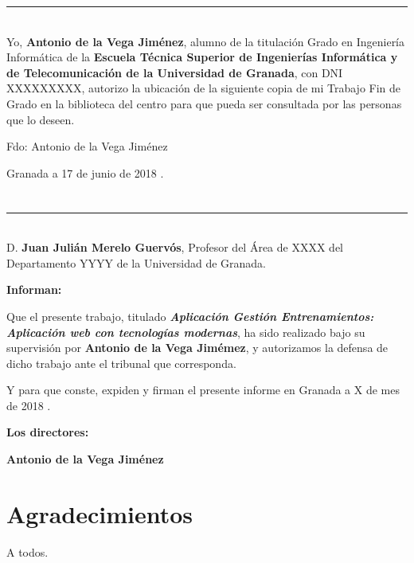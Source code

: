 \noindent\rule[-1ex]{\textwidth}{2pt}\\[4.5ex]

Yo, \textbf{Antonio de la Vega Jiménez}, alumno de la titulación Grado en Ingeniería Informática de la \textbf{Escuela Técnica Superior
de Ingenierías Informática y de Telecomunicación de la Universidad de Granada}, con DNI XXXXXXXXX, autorizo la
ubicación de la siguiente copia de mi Trabajo Fin de Grado en la biblioteca del centro para que pueda ser
consultada por las personas que lo deseen.

\vspace{6cm}

\noindent Fdo: Antonio de la Vega Jiménez

\vspace{2cm}

\begin{flushright}
Granada a 17 de junio de 2018 .
\end{flushright}


\chapter*{}
\thispagestyle{empty}

\noindent\rule[-1ex]{\textwidth}{2pt}\\[4.5ex]

D. \textbf{Juan Julián Merelo Guervós}, Profesor del Área de XXXX del Departamento YYYY de la Universidad de Granada.

\vspace{0.5cm}

\textbf{Informan:}

\vspace{0.5cm}

Que el presente trabajo, titulado \textit{\textbf{Aplicación Gestión Entrenamientos: Aplicación web con tecnologías modernas}},
ha sido realizado bajo su supervisión por \textbf{Antonio de la Vega Jimémez}, y autorizamos la defensa de dicho trabajo ante el tribunal
que corresponda.

\vspace{0.5cm}

Y para que conste, expiden y firman el presente informe en Granada a X de mes de 2018 .

\vspace{1cm}

\textbf{Los directores:}

\vspace{5cm}

\noindent \textbf{Antonio de la Vega Jiménez \ \ \ \ \ }

\chapter*{Agradecimientos}
\thispagestyle{empty}

       \vspace{1cm}


A todos.

